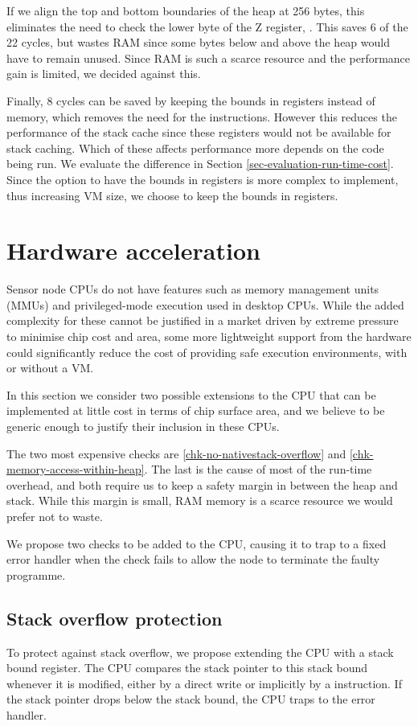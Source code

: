 If we align the top and bottom boundaries of the heap at 256 bytes, this eliminates the need to check the lower byte of the Z register, . This saves 6 of the 22 cycles, but wastes RAM since some bytes below and above the heap would have to remain unused. Since RAM is such a scarce resource and the performance gain is limited, we decided against this.

Finally, 8 cycles can be saved by keeping the bounds in registers instead of memory, which removes the need for the  instructions. However this reduces the performance of the stack cache since these registers would not be available for stack caching. Which of these affects performance more depends on the code being run. We evaluate the difference in Section \ref{sec-evaluation-run-time-cost}. Since the option to have the bounds in registers is more complex to implement, thus increasing VM size, we choose to keep the bounds in registers.


\section{Hardware acceleration}
Sensor node CPUs do not have features such as memory management units (MMUs) and privileged-mode execution used in desktop CPUs. While the added complexity for these cannot be justified in a market driven by extreme pressure to minimise chip cost and area, some more lightweight support from the hardware could significantly reduce the cost of providing safe execution environments, with or without a VM.

In this section we consider two possible extensions to the CPU that can be implemented at little cost in terms of chip surface area, and we believe to be generic enough to justify their inclusion in these CPUs.

The two most expensive checks are \ref{chk-no-nativestack-overflow} and \ref{chk-memory-access-within-heap}. The last is the cause of most of the run-time overhead, and both require us to keep a safety margin in between the heap and stack. While this margin is small, RAM memory is a scarce resource we would prefer not to waste.

We propose two checks to be added to the CPU, causing it to trap to a fixed error handler when the check fails to allow the node to terminate the faulty programme.

\subsection{Stack overflow protection}
To protect against stack overflow, we propose extending the CPU with a stack bound register. The CPU compares the stack pointer to this stack bound whenever it is modified, either by a direct write or implicitly by a  instruction. If the stack pointer drops below the stack bound, the CPU traps to the error handler.


